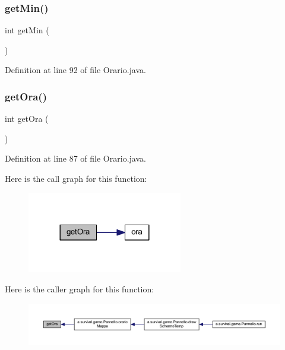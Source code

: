 \subsubsection{\texorpdfstring{get\+Min()}{getMin()}}
{\footnotesize\ttfamily int get\+Min (\begin{DoxyParamCaption}{ }\end{DoxyParamCaption})}



Definition at line 92 of file Orario.\+java.

\mbox{\label{classa_1_1survival_1_1game_1_1_orario_afabaf052fc488e8c99104046a342feea}} 
\subsubsection{\texorpdfstring{get\+Ora()}{getOra()}}
{\footnotesize\ttfamily int get\+Ora (\begin{DoxyParamCaption}{ }\end{DoxyParamCaption})}



Definition at line 87 of file Orario.\+java.

Here is the call graph for this function\+:
\nopagebreak
\begin{figure}[H]
\begin{center}
\leavevmode
\includegraphics[width=192pt]{classa_1_1survival_1_1game_1_1_orario_afabaf052fc488e8c99104046a342feea_cgraph}
\end{center}
\end{figure}
Here is the caller graph for this function\+:
\nopagebreak
\begin{figure}[H]
\begin{center}
\leavevmode
\includegraphics[width=350pt]{classa_1_1survival_1_1game_1_1_orario_afabaf052fc488e8c99104046a342feea_icgraph}
\end{center}
\end{figure}
\mbox{\label{classa_1_1survival_1_1game_1_1_orario_a5dbecc8b3d698dae712952c4b30a4699}} 
